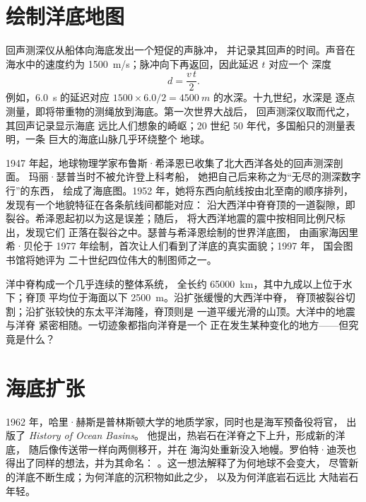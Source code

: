 \section{绘制洋底地图}

回声测深仪从船体向海底发出一个短促的声脉冲，
并记录其回声的时间。声音在海水中的速度约为
\qty{1500}{m/s}；脉冲向下再返回，因此延迟 $t$ 对应一个
深度
\[
  d = \frac{v\,t}{2}.
\]
例如，\qty{6.0}{s} 的延迟对应 $1500 \times 6.0/2 =
\qty{4500}{m}$ 的水深。十九世纪，水深是
逐点测量，即将带重物的测绳放到海底。第一次世界大战后，
回声测深仪取而代之，其回声记录显示海底
远比人们想象的崎岖；20 世纪 50 年代，多国船只的测量表明，一条
巨大的海底山脉几乎环绕整个
地球。

\begin{history}[玛丽·瑟普与裂谷，1952]
1947 年起，地球物理学家布鲁斯·希泽恩已收集了北大西洋各处的回声测深剖面。
玛丽·瑟普当时不被允许登上科考船，
她把自己后来称之为“无尽的测深数字行”的东西，
绘成了海底图。1952 年，她将东西向航线按由北至南的顺序排列，
发现有一个地貌特征在各条航线间都能对应：
沿大西洋中脊脊顶的一道裂隙，即
裂谷。希泽恩起初以为这是误差；随后，
将大西洋地震的震中按相同比例尺标出，发现它们
正落在裂谷之中。瑟普与希泽恩绘制的世界洋底图，
由画家海因里希·贝伦于 1977 年绘制，首次让人们看到了洋底的真实面貌；1997 年，
国会图书馆将她评为
二十世纪四位伟大的制图师之一。
\end{history}

洋中脊构成一个几乎连续的整体系统，
全长约 \qty{65000}{km}，其中九成以上位于水下；脊顶
平均位于海面以下 \qty{2500}{m}。沿扩张缓慢的大西洋中脊，
脊顶被裂谷切割；沿扩张较快的东太平洋海隆，脊顶则是
一道平缓光滑的山顶。大洋中的地震与洋脊
紧密相随。一切迹象都指向洋脊是一个
正在发生某种变化的地方——但究竟是什么？

\section{海底扩张}

\begin{history}[赫斯与传送带，1962]
1962 年，哈里·赫斯是普林斯顿大学的地质学家，同时也是海军预备役将官，
出版了 \emph{History of Ocean Basins}。
他提出，热岩石在洋脊之下上升，形成新的洋底，
随后像传送带一样向两侧移开，并在
海沟处重新没入地幔。罗伯特·迪茨也得出了同样的想法，并为其命名：
。这一想法解释了为何地球不会变大，
尽管新的洋底不断生成；为何洋底的沉积物如此之少，
以及为何洋底岩石远比
大陆岩石年轻。
\end{history}

